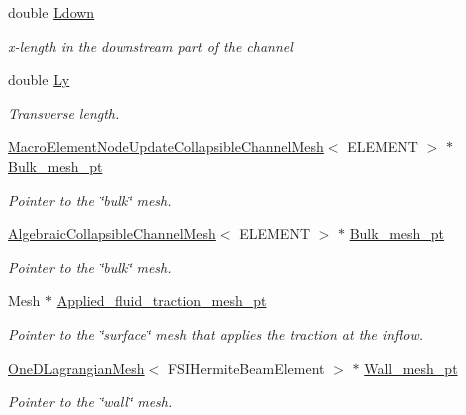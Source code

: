 \begin{DoxyCompactItemize}
double \hyperlink{classFSICollapsibleChannelProblem_a0964686847cc64f2a77a866187aec626}{Ldown}
\begin{DoxyCompactList}\small\item\em x-\/length in the downstream part of the channel \end{DoxyCompactList}\item 
double \hyperlink{classFSICollapsibleChannelProblem_adb381270408cea69b7290ff2aeb5928f}{Ly}
\begin{DoxyCompactList}\small\item\em Transverse length. \end{DoxyCompactList}\item 
\hyperlink{classoomph_1_1MacroElementNodeUpdateCollapsibleChannelMesh}{Macro\+Element\+Node\+Update\+Collapsible\+Channel\+Mesh}$<$ E\+L\+E\+M\+E\+NT $>$ $\ast$ \hyperlink{classFSICollapsibleChannelProblem_ab2eb47a9ed4ce8adb3b11ac316644cde}{Bulk\+\_\+mesh\+\_\+pt}
\begin{DoxyCompactList}\small\item\em Pointer to the \char`\"{}bulk\char`\"{} mesh. \end{DoxyCompactList}\item 
\hyperlink{classoomph_1_1AlgebraicCollapsibleChannelMesh}{Algebraic\+Collapsible\+Channel\+Mesh}$<$ E\+L\+E\+M\+E\+NT $>$ $\ast$ \hyperlink{classFSICollapsibleChannelProblem_a74c09286f4ad4242c37b6ea16c069fae}{Bulk\+\_\+mesh\+\_\+pt}
\begin{DoxyCompactList}\small\item\em Pointer to the \char`\"{}bulk\char`\"{} mesh. \end{DoxyCompactList}\item 
Mesh $\ast$ \hyperlink{classFSICollapsibleChannelProblem_a0594bd63457b032bcf2a1b6bba534c7e}{Applied\+\_\+fluid\+\_\+traction\+\_\+mesh\+\_\+pt}
\begin{DoxyCompactList}\small\item\em Pointer to the \char`\"{}surface\char`\"{} mesh that applies the traction at the inflow. \end{DoxyCompactList}\item 
\hyperlink{classoomph_1_1OneDLagrangianMesh}{One\+D\+Lagrangian\+Mesh}$<$ F\+S\+I\+Hermite\+Beam\+Element $>$ $\ast$ \hyperlink{classFSICollapsibleChannelProblem_a2699abcfe8de6b73bbef098e0f0dc1db}{Wall\+\_\+mesh\+\_\+pt}
\begin{DoxyCompactList}\small\item\em Pointer to the \char`\"{}wall\char`\"{} mesh. \end{DoxyCompactList}\item 

\end{DoxyCompactItemize}
